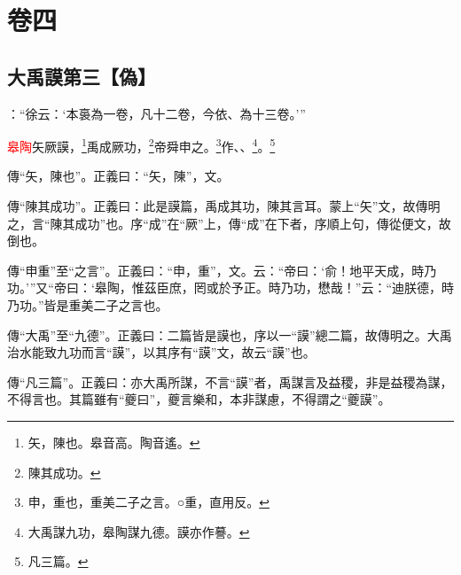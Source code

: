 

\chapter{卷四}


\section{大禹謨第三【偽】}


 {\noindent{}\fzbyks {}：“徐云：‘本裛為一卷，凡十二卷，今依、為十三卷。’” \par}

\textcolor{red}{皋陶}矢厥謨，\footnote{矢，陳也。皋音高。陶音遙。}禹成厥功，\footnote{陳其成功。}帝舜申之。\footnote{申，重也，重美二子之言。○重，直用反。}作、、\footnote{大禹謀九功，皋陶謀九德。謨亦作謩。}\CJKunderwave{\textcolor{red}{益稷}}。\footnote{凡三篇。}

{\noindent\zhuan{}\fzbyks 傳“矢，陳也”。正義曰：“矢，陳”，文。 \par}

{\noindent\zhuan{}\fzbyks 傳“陳其成功”。正義曰：此是謨篇，禹成其功，陳其言耳。蒙上“矢”文，故傳明之，言“陳其成功”也。序“成”在“厥”上，傳“成”在下者，序順上句，傳從便文，故倒也。 \par}

{\noindent\zhuan{}\fzbyks 傳“申重”至“之言”。正義曰：“申，重”，文。云：“帝曰：‘俞！地平天成，時乃功。’”又“帝曰：‘皋陶，惟茲臣庶，罔或於予正。時乃功，懋哉！”云：“迪朕德，時乃功。”皆是重美二子之言也。 \par}

{\noindent\zhuan{}\fzbyks 傳“大禹”至“九德”。正義曰：二篇皆是謨也，序以一“謨”總二篇，故傳明之。大禹治水能致九功而言“謨”，以其序有“謨”文，故云“謨”也。 \par}

{\noindent\zhuan{}\fzbyks 傳“凡三篇”。正義曰：亦大禹所謀，不言“謨”者，禹謀言及益稷，非是益稷為謀，不得言也。其篇雖有“夔曰”，夔言樂和，本非謀慮，不得謂之“夔謨”。 \par}

